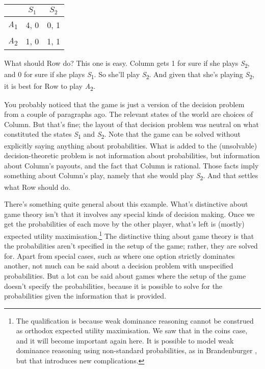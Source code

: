 \documentclass[
  11pt,
]{book}
\begin{document}
\begin{longtable}[]{@{}lcc@{}}
\toprule()
& \(S_1\) & \(S_2\) \\
\midrule()
\endhead
\emph{A}\textsubscript{1} & 4, 0 & 0, 1 \\
\emph{A}\textsubscript{2} & 1, 0 & 1, 1 \\
\bottomrule()
\end{longtable}

What should Row do? This one is easy. Column gets 1 for sure if she plays \emph{S}\textsubscript{2}, and 0 for sure if she plays \emph{S}\textsubscript{1}. So she'll play \emph{S}\textsubscript{2}. And given that she's playing \emph{S}\textsubscript{2}, it is best for Row to play \emph{A}\textsubscript{2}.

You probably noticed that the game is just a version of the decision problem from a couple of paragraphs ago. The relevant states of the world are choices of Column. But that's fine; the layout of that decision problem was neutral on what constituted the states \emph{S}\textsubscript{1} and \emph{S}\textsubscript{2}. Note that the game can be solved without explicitly saying anything about probabilities. What is added to the (unsolvable) decision-theoretic problem is not information about probabilities, but information about Column's payouts, and the fact that Column is rational. Those facts imply something about Column's play, namely that she would play \emph{S}\textsubscript{2}. And that settles what Row should do.

There's something quite general about this example. What's distinctive about game theory isn't that it involves any special kinds of decision making. Once we get the probabilities of each move by the other player, what's left is (mostly) expected utility maximisation.\footnote{The qualification is because weak dominance reasoning cannot be construed as orthodox expected utility maximisation. We saw that in the coins case, and it will become important again here. It is possible to model weak dominance reasoning using non-standard probabilities, as in Brandenburger \citeyearpar{Brandenburger2008}, but that introduces new complications.} The distinctive thing about game theory is that the probabilities aren't specified in the setup of the game; rather, they are solved for. Apart from special cases, such as where one option strictly dominates another, not much can be said about a decision problem with unspecified probabilities. But a lot can be said about games where the setup of the game doesn't specify the probabilities, because it is possible to solve for the probabilities given the information that is provided.
\end{document}
